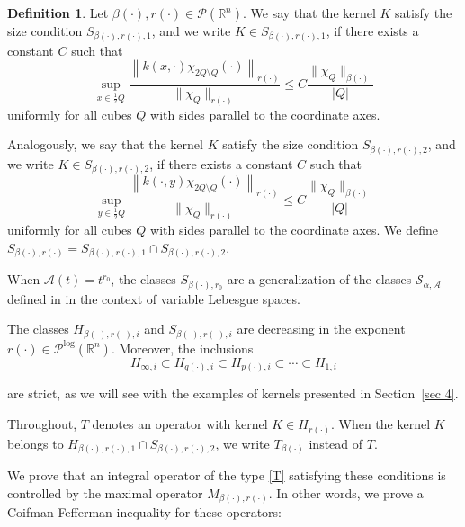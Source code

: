 \documentclass[a4paper,11pt,reqno]{amsart}
\theoremstyle{plain}
\numberwithin{equation}{section}
\theoremstyle{definition}
\newtheorem{defi}[teo]{Definition}
\newcommand{\R}{{\mathbb{R}^n}}
\begin{document}
\begin{defi}\label{def SrB}
	Let ${\beta(\cdot)},{r(\cdot)}\in\mathcal{P}(\R)$. We say that the kernel $K$ satisfy the size condition $S_{\beta(\cdot),r(\cdot),1}$, and we write $K\in S_{\beta(\cdot),r(\cdot),1}$, if there exists a constant $C$ such that 
	\begin{equation*}
	\sup_{x\in\frac{1}{2}Q}\frac{\left\|k(x,\cdot)\chi_{2Q\setminus Q}(\cdot)\right\|_{r(\cdot)}}{\|\chi_{Q}\|_{r(\cdot)}}\leq C\frac{\|\chi_{Q}\|_{\beta(\cdot)}}{|Q|}
	\end{equation*}  
	uniformly for all cubes $Q$ with sides parallel to the coordinate axes. 
	
	Analogously, we say that the kernel $K$ satisfy the size condition $S_{\beta(\cdot),r(\cdot),2}$, and we write $K\in S_{\beta(\cdot),r(\cdot),2}$, if there exists a constant $C$ such that 
	\begin{equation*}
	\sup_{y\in\frac{1}{2}Q}\frac{\left\|k(\cdot,y)\chi_{2Q\setminus Q}(\cdot)\right\|_{r(\cdot)}}{\|\chi_{Q}\|_{r(\cdot)}}\leq C\frac{\|\chi_{Q}\|_{\beta(\cdot)}}{|Q|}
	\end{equation*}  
	uniformly for all cubes $Q$ with sides parallel to the coordinate axes. We define $S_{\beta(\cdot),r(\cdot)}=S_{\beta(\cdot),r(\cdot),1}\cap S_{\beta(\cdot),r(\cdot),2}$.
\end{defi}

 When $\mathscr{A}(t)=t^{r_0}$, the classes $S_{\beta(\cdot),r_0}$ are a generalization of the classes $\mathcal{S}_{\alpha,\mathscr{A}}$ defined in \cite{S_A} in the context of variable Lebesgue spaces.

The classes $H_{\beta(\cdot),r(\cdot),i}$ and $S_{\beta(\cdot),r(\cdot),i}$ are decreasing in the exponent \\$r(\cdot)\in\mathcal{P}^{\text{log}}(\R)$. Moreover, the inclusions
\begin{equation}\label{contenciones de Hr}
	H_{\infty,i}\subset H_{q(\cdot),i}\subset H_{p(\cdot),i}\subset\cdots \subset H_{1,i}
\end{equation}

 are strict, as we will see with the examples of kernels presented in Section~\ref{sec 4}.

Throughout, $T$ denotes an operator with kernel $K\in H_{r(\cdot)}$. When the kernel $K$ belongs to $H_{\beta(\cdot),r(\cdot),1} \cap S_{\beta(\cdot),r(\cdot),2}$, we write $T_{\beta(\cdot)}$ instead of $T$.

We prove that an integral operator of the type \eqref{T} satisfying these conditions is controlled by the maximal operator $M_{\beta(\cdot),r(\cdot)}$. In other words, we prove a Coifman-Fefferman inequality for these operators:
\end{document}
